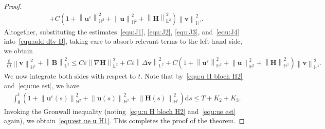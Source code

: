 \documentclass[11pt, reqno]{amsart}
\theoremstyle{definition}
\theoremstyle{remark}
\numberwithin{equation}{section}
\newcommand{\bff}{\boldsymbol}
\newcommand{\bb}{\mathbb}
\newcommand{\ddt}{\frac{\mathrm{d}}{\mathrm{d}t}}
\newcommand{\ds}{\mathrm{d}s}
\newcommand{\norm}[2]{\left\|{#1}\right\|_{#2}}
\begin{document}
\begin{proof}
\begin{align}
	+
	C\left(1+\norm{\bff{u}^\varepsilon}{\bb{H}^2}^2 + \norm{\bff{u}}{\bb{H}^2}^2
	+ \norm{\bff{H}}{\bb{L}^2}^2 \right)\norm{\bff{v}}{\bb{H}^1}^2.
\end{align}
Altogether, substituting the estimates~\eqref{equ:J1}, \eqref{equ:J2}, \eqref{equ:J3}, and~\eqref{equ:J4} into~\eqref{equ:add dtv B}, taking care to absorb relevant terms to the left-hand side, we obtain
\begin{align*}
	\ddt \norm{\bff{v}}{\bb{H}^1}^2
	+
	\norm{\bff{B}}{\bb{L}^2}^2
	\leq
	C\varepsilon \norm{\nabla \bff{H}}{\bb{L}^2}^2
	+
	C\varepsilon \norm{\Delta \bff{v}}{\bb{L}^2}^2
	+
	C\left(1+\norm{\bff{u}^\varepsilon}{\bb{H}^2}^2 + \norm{\bff{u}}{\bb{H}^2}^2
	+ \norm{\bff{H}}{\bb{H}^1}^2 \right)\norm{\bff{v}}{\bb{H}^1}^2.
\end{align*}
We now integrate both sides with respect to $t$. Note that by~\eqref{equ:u H bloch H2} and~\eqref{equ:ue est}, we have
\begin{align*}
	\int_0^t \left(1+ \norm{\bff{u}^\varepsilon(s)}{\bb{H}^2}^2 + \norm{\bff{u}(s)}{\bb{H}^2}^2
	+ \norm{\bff{H}(s)}{\bb{H}^1}^2 \right) \ds \leq 
	T+K_2+K_3.
\end{align*}
Invoking the Gronwall inequality (noting~\eqref{equ:u H bloch H2} and~\eqref{equ:ue est} again), we obtain~\eqref{equ:est ue u H1}. This completes the proof of the theorem.
\end{proof}
\end{document}
